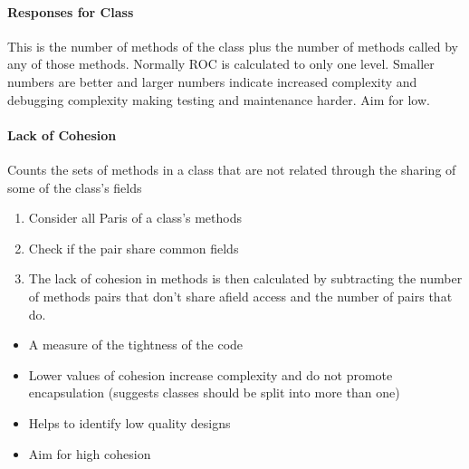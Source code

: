 \paragraph{Responses for Class}\label{par:responses_for_class}

This is the number of methods of the class plus the number of methods called by any of those methods.
Normally ROC is calculated to only one level.
Smaller numbers are better and larger numbers indicate increased complexity and debugging complexity making testing and maintenance harder.
Aim for low.

\paragraph{Lack of Cohesion}\label{par:lack_of_cohesion}

Counts the sets of methods in a class that are not related through the sharing of some of the class's fields
\begin{enumerate}
	\item Consider all Paris of a class's methods
	\item Check if the pair share common fields
	\item The lack of cohesion in methods is then calculated by subtracting the number of methods pairs that don't share afield access and the number of pairs that do.
\end{enumerate}

\begin{itemize}
	\item A measure of the tightness of the code
	\item Lower values of cohesion increase complexity and do not promote encapsulation (suggests classes should be split into more than one)
	\item Helps to identify low quality designs
	\item Aim for high cohesion
\end{itemize}
